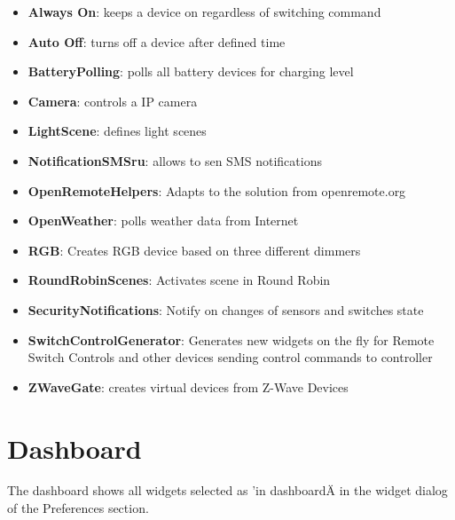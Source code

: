 \begin{itemize}
\item \textbf{Always On}: keeps a device on regardless of switching command
\item \textbf{Auto Off}: turns off a device after defined time
\item \textbf{BatteryPolling}: polls all battery devices for charging level
\item \textbf{Camera}: controls a IP camera
\item \textbf{LightScene}: defines light scenes
\item \textbf{NotificationSMSru}: allows to sen SMS notifications
\item \textbf{OpenRemoteHelpers}: Adapts to the solution from openremote.org
\item \textbf{OpenWeather}: polls weather data from Internet
\item \textbf{RGB}: Creates RGB device based on three different dimmers
\item \textbf{RoundRobinScenes}: Activates scene in Round Robin
\item \textbf{SecurityNotifications}: Notify on changes of sensors and switches state
\item \textbf{SwitchControlGenerator}: Generates new widgets on the fly for Remote Switch 
Controls and other devices sending control commands to controller
\item \textbf{ZWaveGate}: creates virtual devices from Z-Wave Devices
\end{itemize}

\section{Dashboard}

The dashboard shows all widgets selected as 'in dashboardÄ in the widget 
dialog of the Preferences section.
